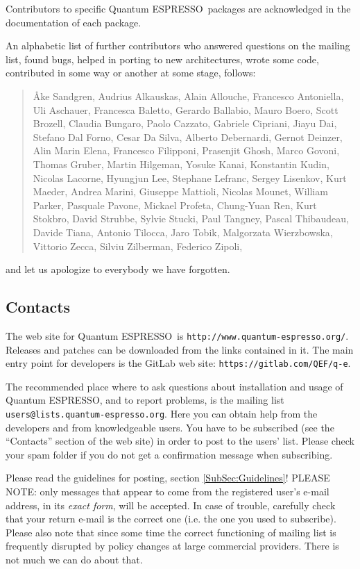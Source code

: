 \documentclass[12pt,a4paper]{article}
\def\qe{{\sc Quantum ESPRESSO}}
\begin{document}
Contributors to specific \qe\ packages are acknowledged in the
documentation of each package.

An alphabetic list of further
contributors who answered questions on the mailing list, found
bugs, helped in porting to new architectures, wrote some code,
contributed in some way or another at some stage, follows:
\begin{quote}
  {\AA}ke Sandgren, Audrius Alkauskas, Alain Allouche, Francesco Antoniella,
  Uli Aschauer, Francesca Baletto, Gerardo Ballabio, Mauro Boero,
  Scott Brozell, Claudia Bungaro, Paolo Cazzato, Gabriele Cipriani,
  Jiayu Dai, Stefano Dal Forno, Cesar Da Silva, Alberto Debernardi,
  Gernot Deinzer, Alin Marin Elena, Francesco Filipponi, Prasenjit Ghosh,
  Marco Govoni, Thomas Gruber, Martin Hilgeman, Yosuke Kanai, Konstantin Kudin,
  Nicolas Lacorne, Hyungjun Lee, Stephane Lefranc, Sergey Lisenkov, Kurt Maeder,
  Andrea Marini, Giuseppe Mattioli, Nicolas Mounet, William Parker,
  Pasquale Pavone, Mickael Profeta, Chung-Yuan Ren,
  Kurt Stokbro, David Strubbe, Sylvie Stucki, Paul Tangney, Pascal Thibaudeau,
  Davide Tiana, Antonio Tilocca, Jaro Tobik, Malgorzata Wierzbowska,
  Vittorio Zecca, Silviu Zilberman, Federico Zipoli,
\end{quote}
and let us apologize to everybody we have forgotten.

\subsection{Contacts}
\label{SubSec:Contacts}

The web site for \qe\ is \texttt{http://www.quantum-espresso.org/}.
Releases and patches can be downloaded from the links contained in it. 
The main entry point for developers is the GitLab web site:
\texttt{https://gitlab.com/QEF/q-e}.

The recommended place where to ask questions about installation
and usage of \qe, and to report problems, is the 
mailing list \texttt{users@lists.quantum-espresso.org}.
Here you can obtain help from the developers and from
knowledgeable users. You have to be subscribed (see the ``Contacts''
section of the web site) in order to post to the  users' list.
Please check your spam folder if you do not get a confirmation
message when subscribing.

Please read the guidelines for posting, section \ref{SubSec:Guidelines}!
PLEASE NOTE: only messages that appear to come from the
registered user's e-mail address, in its {\em exact form}, will be
accepted. In case of trouble, carefully check that your return
e-mail is the correct one (i.e. the one you used to subscribe).
Please also note that since some time the correct functioning of mailing
list is frequently disrupted by policy changes at large commercial
providers. There is not much we can do about that.
\end{document}
